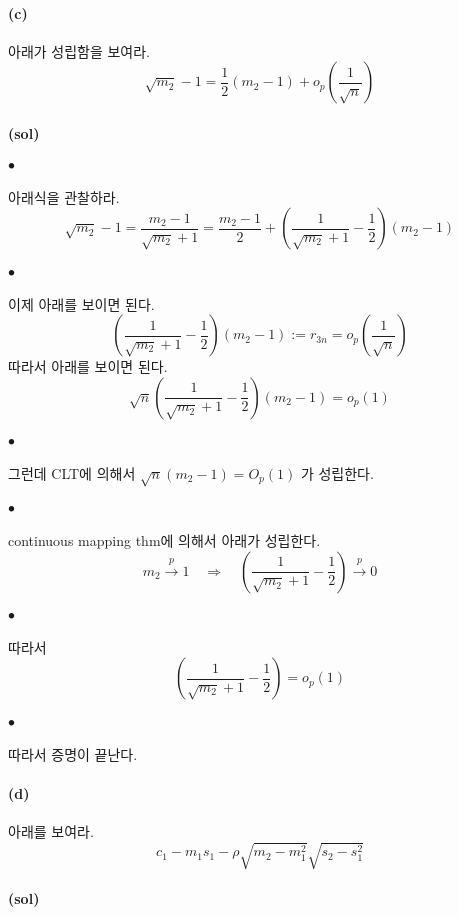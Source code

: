 \documentclass[12pt,oneside,english]{book}
\def\ck{\paragraph{\Large$\bullet$}\Large}
\def\sol{\paragraph{\Large(sol)}\Large}
\def\ckc{\paragraph{\Large(c)}\Large}
\def\ckd{\paragraph{\Large(d)}\Large}
\begin{document}
\ckc 아래가 성립함을 보여라. 
\[
\sqrt{m_2}-1=\frac{1}{2}(m_2-1)+o_p\left(\frac{1}{\sqrt{n}}\right)
\]
\sol 

\ck 아래식을 관찰하라. 
\[
\sqrt{m_2}-1=\frac{m_2-1}{\sqrt{m_2}+1}=\frac{m_2-1}{2}+\left(\frac{1}{\sqrt{m_2}+1}-\frac{1}{2}\right)(m_2-1)
\]

\ck 이제 아래를 보이면 된다. 
\[
\left(\frac{1}{\sqrt{m_2}+1}-\frac{1}{2}\right)(m_2-1):=r_{3n}=o_p\left(\frac{1}{\sqrt{n}}\right)
\]
따라서 아래를 보이면 된다. 
\[
\sqrt{n}\left(\frac{1}{\sqrt{m_2}+1}-\frac{1}{2}\right)(m_2-1)=o_p(1)
\]

\ck 그런데 CLT에 의해서 $\sqrt{n}(m_2-1)=O_p(1)$ 가 성립한다. 

\ck continuous mapping thm에 의해서 아래가 성립한다. 
\[
m_2 \overset{p}{\to} 1 \quad \Longrightarrow 
\quad \left(\frac{1}{\sqrt{m_2}+1}-\frac{1}{2}\right) \overset{p}{\to} 0
\]

\ck 따라서 
\[
\left(\frac{1}{\sqrt{m_2}+1}-\frac{1}{2}\right)=o_p(1)
\]

\ck 따라서 증명이 끝난다. 

\ckd 아래를 보여라. 
\[
c_1-m_1s_1-\rho\sqrt{m_2-m_1^2}\sqrt{s_2-s_1^2}
\]
\sol 
\end{document}
